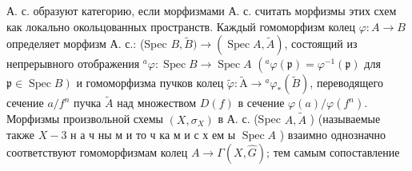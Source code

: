 \documentclass[10pt]{article}
\begin{document}
А. с. образуют категорию, если морфизмами А. с. считать морфизмы этих схем как локально окольцованных пространств. Каждый гомоморфизм колец $\varphi: A \rightarrow B$ определяет морфизм А. с.: (Spec $B, \tilde{B}) \rightarrow(\operatorname{Spec} A, \tilde{A})$, состоящий из непрерывного отображения ${ }^{a} \varphi: \operatorname{Spec} B \rightarrow \operatorname{Spec} A$ $\left({ }^{a} \varphi(\mathfrak{p})=\varphi^{-1}(\mathfrak{p})\right.$ для $\left.\mathfrak{p} \in \operatorname{Spec} B\right)$ и гомоморфизма пучков колец $\tilde{\varphi}: \tilde{\mathrm{A}} \rightarrow{ }^{a} \varphi_{*}(\tilde{B})$, переводящего сечение $a / f^{n}$ пучка $\tilde{A}$ над множеством $D(f)$ в сечение $\varphi(a) / \varphi\left(f^{n}\right)$. Морфизмы произвольной схемы $\left(X, \sigma_{X}\right)$ в А. с. (Spec $A, \tilde{A}$ ) (называемые также $X-3$ н а ч ны м и то ч ка м и с х ем ы $\operatorname{Spec} A$ ) взаимно однозначно соответствуют гомоморфизмам колец $A \rightarrow \Gamma(X, \widehat{G})$; тем самым сопоставление
\end{document}

